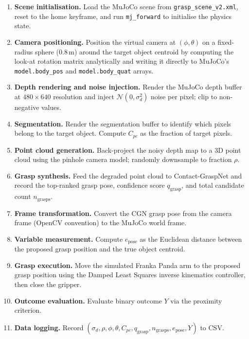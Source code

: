 \documentclass[11pt,a4paper]{report}
\begin{document}
\begin{enumerate}
  \item \textbf{Scene initialisation.} Load the MuJoCo scene from \texttt{grasp\_scene\_v2.xml}, reset to the home keyframe, and run \texttt{mj\_forward} to initialise the physics state.

  \item \textbf{Camera positioning.} Position the virtual camera at $(\phi, \theta)$ on a fixed-radius sphere (0.8\,m) around the target object centroid by computing the look-at rotation matrix analytically and writing it directly to MuJoCo's \texttt{model.body\_pos} and \texttt{model.body\_quat} arrays.

  \item \textbf{Depth rendering and noise injection.} Render the MuJoCo depth buffer at $480 \times 640$ resolution and inject $\mathcal{N}(0, \sigma_d^2)$ noise per pixel; clip to non-negative values.

  \item \textbf{Segmentation.} Render the segmentation buffer to identify which pixels belong to the target object. Compute $C_{pc}$ as the fraction of target pixels.

  \item \textbf{Point cloud generation.} Back-project the noisy depth map to a 3D point cloud using the pinhole camera model; randomly downsample to fraction $\rho$.

  \item \textbf{Grasp synthesis.} Feed the degraded point cloud to Contact-GraspNet and record the top-ranked grasp pose, confidence score $q_{\text{grasp}}$, and total candidate count $n_{\text{grasps}}$.

  \item \textbf{Frame transformation.} Convert the CGN grasp pose from the camera frame (OpenCV convention) to the MuJoCo world frame.

  \item \textbf{Variable measurement.} Compute $e_{\text{pose}}$ as the Euclidean distance between the proposed grasp position and the true object centroid.

  \item \textbf{Grasp execution.} Move the simulated Franka Panda arm to the proposed grasp position using the Damped Least Squares inverse kinematics controller, then close the gripper.

  \item \textbf{Outcome evaluation.} Evaluate binary outcome $Y$ via the proximity criterion.

  \item \textbf{Data logging.} Record $(\sigma_d, \rho, \phi, \theta, C_{pc}, q_{\text{grasp}}, n_{\text{grasps}}, e_{\text{pose}}, Y)$ to CSV.
\end{enumerate}
\end{document}
